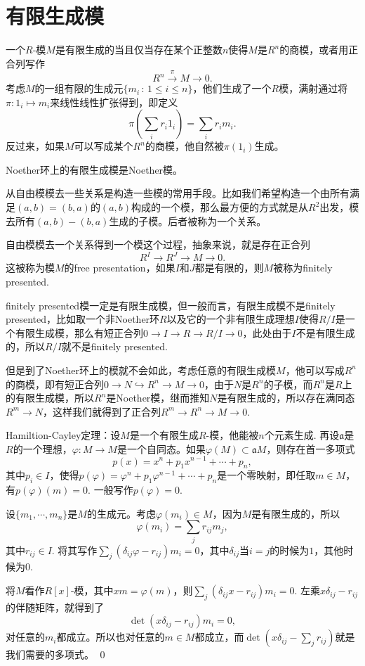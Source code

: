 \section{有限生成模}

\para 一个$R$-模$M$是有限生成的当且仅当存在某个正整数$n$使得$M$是$R^n$的商模，或者用正合列写作
\[
	R^n \xrightarrow{\pi} M\to 0.
\]
考虑$M$的一组有限的生成元$\{m_i\,:\, 1\leq i\leq n\}$，他们生成了一个$R$模，满射通过将$\pi:1_i\mapsto m_i$来线性线性扩张得到，即定义
\[
	\pi\left(\sum_i r_i 1_i\right)=\sum_i r_i m_i.
\]
反过来，如果$M$可以写成某个$R^n$的商模，他自然被$\pi(1_i)$生成。

\pro Noether环上的有限生成模是Noether模。

\para 从自由模模去一些关系是构造一些模的常用手段。比如我们希望构造一个由所有满足$(a,b)=(b,a)$的$(a,b)$构成的一个模，那么最方便的方式就是从$R^2$出发，模去所有$(a,b)-(b,a)$生成的子模。后者被称为一个关系。

自由模模去一个关系得到一个模这个过程，抽象来说，就是存在正合列
\[
	R^I\to R^J \to M\to 0.
\]
这被称为模$M$的free presentation，如果$I$和$J$都是有限的，则$M$被称为finitely presented.

finitely presented模一定是有限生成模，但一般而言，有限生成模不是finitely presented，比如取一个非Noether环$R$以及它的一个非有限生成理想$I$使得$R/I$是一个有限生成模，那么有短正合列$0\to I\to R \to R/I\to 0$，此处由于$I$不是有限生成的，所以$R/I$就不是finitely presented.

但是到了Noether环上的模就不会如此，考虑任意的有限生成模$M$，他可以写成$R^n$的商模，即有短正合列$0\to N \hookrightarrow R^n \to M\to 0$，由于$N$是$R^n$的子模，而$R^n$是$R$上的有限生成模，所以$R^n$是Noether模，继而推知$N$是有限生成的，所以存在满同态$R^m\to N$，这样我们就得到了正合列$R^m\to R^n\to M\to 0$.

\theo Hamiltion-Cayley定理：设$M$是一个有限生成$R$-模，他能被$n$个元素生成. 再设$\mathfrak{a}$是$R$的一个理想，$\varphi:M\to M$是一个自同态。如果$\varphi(M)\subset \mathfrak{a}M$，则存在首一多项式
\[
	p(x)=x^n+p_1x^{n-1}+\cdots+p_n,
\]
其中$p_i\in I$，使得$p(\varphi)=\varphi^n+p_1\varphi^{n-1}+\cdots+p_n$是一个零映射，即任取$m\in M$，有$p(\varphi)(m)=0$. 一般写作$p(\varphi)=0$.

\proof
	设$\{m_1,\cdots,m_n\}$是$M$的生成元。考虑$\varphi(m_i)\in M$，因为$M$是有限生成的，所以
	\[
	\varphi(m_i)=\sum_{j}r_{ij}m_j,
	\]
	其中$r_{ij}\in I$. 将其写作$\sum_{j}(\delta_{ij}\varphi-r_{ij})m_i=0$，其中$\delta_{ij}$当$i=j$的时候为$1$，其他时候为$0$.

	将$M$看作$R[x]$-模，其中$xm=\varphi(m)$，则$\sum_{j}(\delta_{ij}x-r_{ij})m_i=0$. 左乘$x\delta_{ij}-r_{
	ij}$的伴随矩阵，就得到了
	\[
	\det\left(x\delta_{ij}-r_{ij}\right)m_i=0,
	\]
	对任意的$m_i$都成立。所以也对任意的$m\in M$都成立，而$\det(x\delta_{ij}-\sum_{j}r_{ij})$就是我们需要的多项式。
\qed

